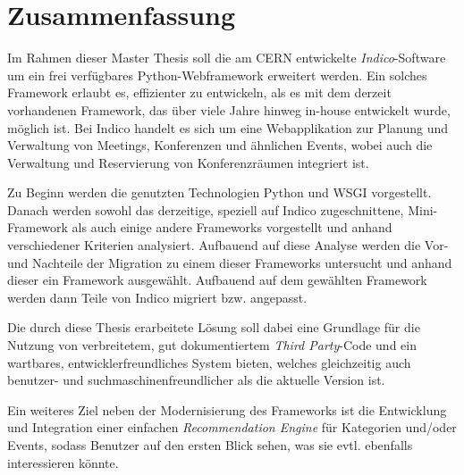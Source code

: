 \chapter*{Zusammenfassung}
\thispagestyle{empty}

Im Rahmen dieser Master Thesis soll die am CERN entwickelte \emph{Indico}-Software um ein frei
verfügbares Python-Webframework erweitert werden. Ein solches Framework erlaubt es, effizienter zu
entwickeln, als es mit dem derzeit vorhandenen Framework, das über viele Jahre hinweg in-house
entwickelt wurde, möglich ist.
Bei Indico handelt es sich um eine Webapplikation zur Planung und Verwaltung von Meetings,
Konferenzen und ähnlichen Events, wobei auch die Verwaltung und Reservierung von Konferenzräumen
integriert ist.

Zu Beginn werden die genutzten Technologien Python und WSGI vorgestellt. Danach werden sowohl
das derzeitige, speziell auf Indico zugeschnittene, Mini-Framework als auch einige andere
Frameworks vorgestellt und anhand verschiedener Kriterien analysiert. Aufbauend auf diese Analyse
werden die Vor- und Nachteile der Migration zu einem dieser Frameworks untersucht und anhand dieser
ein Framework ausgewählt. Aufbauend auf dem gewählten Framework werden dann Teile von Indico
migriert bzw. angepasst.

Die durch diese Thesis erarbeitete Lösung soll dabei eine Grundlage für die Nutzung von
verbreitetem, gut dokumentiertem \emph{Third Party}-Code und ein wartbares, entwicklerfreundliches
System bieten, welches gleichzeitig auch benutzer- und suchmaschinenfreundlicher als die aktuelle
Version ist.

Ein weiteres Ziel neben der Modernisierung des Frameworks ist die Entwicklung und Integration einer
einfachen \emph{Recommendation Engine} für Kategorien und/oder Events, sodass Benutzer auf den
ersten Blick sehen, was sie evtl. ebenfalls interessieren könnte.
